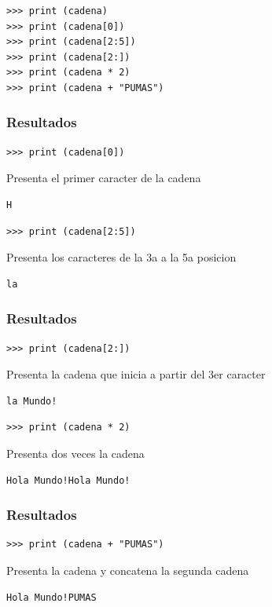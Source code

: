 {\begin{frame}[fragile]
\begin{verbatim}
>>> print (cadena)
>>> print (cadena[0])
>>> print (cadena[2:5])     
>>> print (cadena[2:])
>>> print (cadena * 2)
>>> print (cadena + "PUMAS")
\end{verbatim}
\end{frame}
\begin{frame}[fragile]
\frametitle{Resultados}
\begin{verbatim}
>>> print (cadena[0])
\end{verbatim}
\pause
Presenta el primer caracter de la cadena
\begin{verbatim}
H
\end{verbatim}
\pause
\begin{verbatim}
>>> print (cadena[2:5])
\end{verbatim}
\pause
Presenta los caracteres de la 3a a la 5a posicion
\begin{verbatim}
la
\end{verbatim}
\end{frame}
\begin{frame}[fragile]
\frametitle{Resultados}
\begin{verbatim}
>>> print (cadena[2:])
\end{verbatim}
\pause
Presenta la cadena que inicia a partir del 3er caracter
\begin{verbatim}
la Mundo!
\end{verbatim}
\pause
\begin{verbatim}
>>> print (cadena * 2)
\end{verbatim}
\pause
Presenta dos veces la cadena
\begin{verbatim}
Hola Mundo!Hola Mundo!
\end{verbatim}
\end{frame}
\begin{frame}[fragile]
\frametitle{Resultados}
\begin{verbatim}
>>> print (cadena + "PUMAS")
\end{verbatim}
\pause
Presenta la cadena y concatena la segunda cadena
\begin{verbatim}
Hola Mundo!PUMAS
\end{verbatim}
\end{frame}
}
